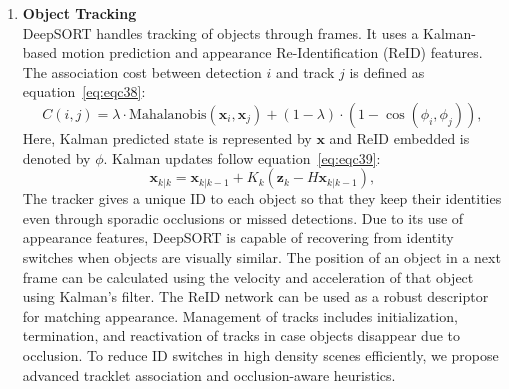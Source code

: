 \documentclass[12pt,a4paper]{report}
\theoremstyle{definition}
\theoremstyle{remark}
\begin{document}
\begin{enumerate}
    \item \textbf{Object Tracking}\\
    DeepSORT handles tracking of objects through frames. It uses a Kalman-based motion prediction and appearance Re-Identification (ReID) features. The association cost between detection $i$ and track $j$ is defined as equation~\ref{eq:eqc38}:
    \begin{equation}
    \label{eq:eqc38}
    C(i, j) = \lambda \cdot \text{Mahalanobis}(\mathbf{x}_i, \mathbf{x}_j) 
            + (1 - \lambda) \cdot (1 - \cos(\phi_i, \phi_j)),
    \end{equation}
    Here, Kalman predicted state is represented by $\mathbf{x}$ and ReID embedded is denoted by $\phi$.
    Kalman updates follow equation~\ref{eq:eqc39}:
    \begin{equation}
    \label{eq:eqc39}
    \mathbf{x}_{k|k} = \mathbf{x}_{k|k-1} + K_k(\mathbf{z}_k - H\mathbf{x}_{k|k-1}),
    \end{equation}
    The tracker gives a unique ID to each object so that they keep their identities even through sporadic occlusions or missed detections. Due to its use of appearance features, DeepSORT is capable of recovering from identity switches when objects are visually similar. The position of an object in a next frame can be calculated using the velocity and acceleration of that object using Kalman’s filter. The ReID network can be used as a robust descriptor for matching appearance. Management of tracks includes initialization, termination, and reactivation of tracks in case objects disappear due to occlusion. To reduce ID switches in high density scenes efficiently, we propose advanced tracklet association and occlusion-aware heuristics.


\end{enumerate}
\end{document}
